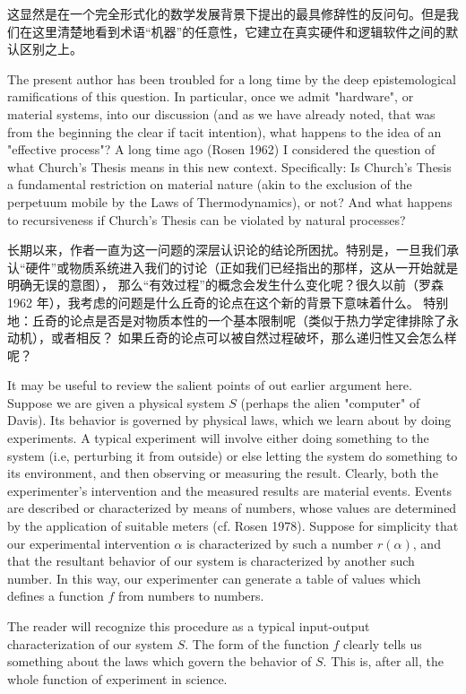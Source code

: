 \documentclass[a4paper,12pt]{article}
\begin{document}
这显然是在一个完全形式化的数学发展背景下提出的最具修辞性的反问句。但是我们在这里清楚地看到术语“机器”的任意性，它建立在真实硬件和逻辑软件之间的默认区别之上。

The present author has been troubled for a long time by the deep epistemological ramifications of this question.  In particular,
once we admit "hardware", or material systems, into our discussion (and as we have already noted, that was from the beginning the clear if tacit intention),
what happens to the idea of an "effective process"?  A long time ago (Rosen 1962) I considered the question of what Church's Thesis
means in this new context. Specifically: Is Church's Thesis a fundamental restriction on material nature (akin to the exclusion of the perpetuum
mobile by the Laws of Thermodynamics), or not? And what happens to recursiveness if Church's Thesis can be violated by natural processes?

长期以来，作者一直为这一问题的深层认识论的结论所困扰。特别是，一旦我们承认“硬件”或物质系统进入我们的讨论（正如我们已经指出的那样，这从一开始就是明确无误的意图），
那么“有效过程”的概念会发生什么变化呢？很久以前（罗森 1962 年），我考虑的问题是什么丘奇的论点在这个新的背景下意味着什么。
特别地：丘奇的论点是否是对物质本性的一个基本限制呢（类似于热力学定律排除了永动机），或者相反？ 如果丘奇的论点可以被自然过程破坏，那么递归性又会怎么样呢？

It may be useful to review the salient points of out earlier argument here. Suppose we are given a physical system $S$ (perhaps the alien "computer" of Davis).
Its behavior is governed by physical laws, which we learn about by doing experiments. A typical experiment will involve either doing something to the system
(i.e, perturbing it from outside) or else letting the system do something to its environment, and then observing or measuring the result.
Clearly, both the experimenter's intervention and the measured results are material events. Events are described or characterized by means of
numbers, whose values are determined by the application of suitable meters (cf. Rosen 1978). Suppose for simplicity that our experimental
intervention $\alpha$ is characterized by such a number $r(\alpha)$, and that the resultant behavior of our system is characterized by another such number.
In this way, our experimenter can generate a table of values which defines a function $f$ from numbers to numbers.


The reader will recognize this procedure as a typical input-output characterization of our system $S$.  The form of the function $f$ clearly
tells us something about the laws which govern the behavior of $S$. This is, after all, the whole function of experiment in science.
\end{document}
